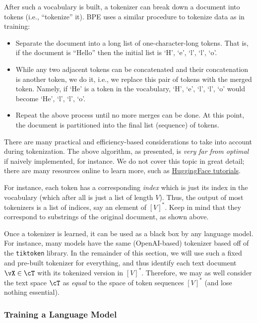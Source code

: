 \documentclass[../../book-main.tex]{subfiles}
\begin{document}
After such a vocabulary is built, a tokenizer can break down a document into tokens (i.e., ``tokenize'' it). BPE uses a similar procedure to tokenize data as in training:
\begin{itemize}
    \item Separate the document into a long list of one-character-long tokens. That is, if the document is ``Hello'' then the initial list is `H', `e', `l', `l', `o'. 
    \item While any two adjacent tokens can be concatenated and their concatenation is another token, we do it, i.e., we replace this pair of tokens with the merged token. Namely, if `He' is a token in the vocabulary, `H', `e', `l', `l', `o' would become `He', `l', `l', `o'.
    \item Repeat the above process until no more merges can be done. At this point, the document is partitioned into the final list (sequence) of tokens.
\end{itemize}

There are many practical and efficiency-based considerations to take into account during tokenization. The above algorithm, as presented, is \textit{very far from optimal} if naively implemented, for instance. We do not cover this topic in great detail; there are many resources online to learn more, such as \href{https://huggingface.co/learn/nlp-course/en/chapter6/5}{HuggingFace tutorials}.

For instance, each token has a corresponding \textit{index} which is just its index in the vocabulary (which after all is just a list of length \(V\)). Thus, the output of most tokenizers is a list of indices, say an element of \([V]^{*}\). Keep in mind that they correspond to substrings of the original document, as shown above.

Once a tokenizer is learned, it can be used as a black box by any language model. For instance, many models have the same (OpenAI-based) tokenizer based off of the \texttt{tiktoken} library. In the remainder of this section, we will use such a fixed and pre-built tokenizer for everything, and thus identify each text document \(\vX \in \cT\) with its tokenized version in \([V]^{*}\). Therefore, we may as well consider the text space \(\cT\) as \textit{equal} to the space of token sequences \([V]^{*}\) (and lose nothing essential).

\subsubsection{Training a Language Model}
\end{document}

